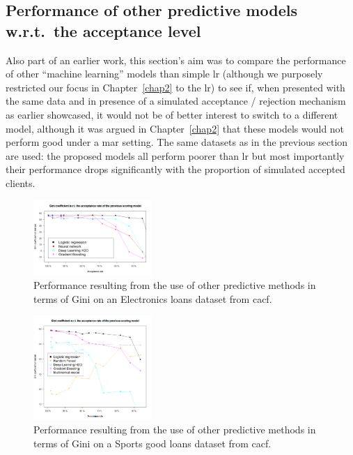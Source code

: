 \subsection{Performance of other predictive models w.r.t.\ the acceptance level} \label{subsec:app_reject_real_method}

Also part of an earlier work, this section's aim was to compare the performance of other ``machine learning'' models than simple \gls{lr} (although we purposely restricted our focus in Chapter~\ref{chap2} to the \gls{lr}) to see if, when presented with the same data and in presence of a simulated acceptance / rejection mechanism as earlier showcased, it would not be of better interest to switch to a different model, although it was argued in Chapter~\ref{chap2} that these models would not perform good under a \gls{mar} setting. The same datasets as in the previous section are used: the proposed models all perform poorer than \gls{lr} but most importantly their performance drops significantly with the proportion of simulated accepted clients.

\begin{figure}[H]
\centering
\includegraphics[width=0.4\textwidth]{figures/appendix/newmodelsdarty.png}
\caption{Performance resulting from the use of other predictive methods in terms of Gini on an Electronics loans dataset from \gls{cacf}.}
\label{fig:darty_othermodels}
\end{figure}

\begin{figure}[H]
\centering
\includegraphics[width=0.4\textwidth]{figures/appendix/newmodelsdecathlon.png}
\caption{Performance resulting from the use of other predictive methods in terms of Gini on a Sports good loans dataset from \gls{cacf}.}
\label{fig:decathlon_othermodels}
\end{figure}

